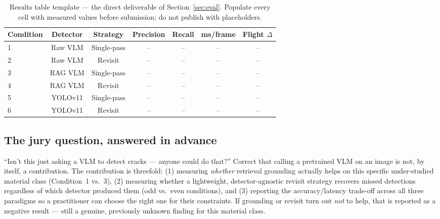 \documentclass[11pt,a4paper]{article}
\begin{document}
\begin{table}[h!]
\centering
\small
\begin{tabular}{lcccccc}
\toprule
\textbf{Condition} & \textbf{Detector} & \textbf{Strategy} & \textbf{Precision} & \textbf{Recall} & \textbf{ms/frame} & \textbf{Flight $\Delta$} \\
\midrule
1 & Raw VLM & Single-pass & -- & -- & -- & -- \\
2 & Raw VLM & Revisit & -- & -- & -- & -- \\
3 & RAG VLM & Single-pass & -- & -- & -- & -- \\
4 & RAG VLM & Revisit & -- & -- & -- & -- \\
5 & YOLOv11 & Single-pass & -- & -- & -- & -- \\
6 & YOLOv11 & Revisit & -- & -- & -- & -- \\
\bottomrule
\end{tabular}
\caption{Results table template --- the direct deliverable of Section~\ref{sec:eval}. Populate every cell with measured values before submission; do not publish with placeholders.}
\label{tab:resultstemplate}
\end{table}

\subsection{The jury question, answered in advance}
\begin{keybox}{``Isn't this just asking a VLM to detect cracks --- anyone could do that?''}
Correct that calling a pretrained VLM on an image is not, by itself, a contribution. The contribution is threefold: (1) measuring \emph{whether} retrieval grounding actually helps on this specific under-studied material class (Condition~1 vs.~3), (2) measuring whether a lightweight, detector-agnostic revisit strategy recovers missed detections regardless of which detector produced them (odd vs.\ even conditions), and (3) reporting the accuracy/latency trade-off across all three paradigms so a practitioner can choose the right one for their constraints. If grounding or revisit turn out \emph{not} to help, that is reported as a negative result --- still a genuine, previously unknown finding for this material class.
\end{keybox}

\end{document}
